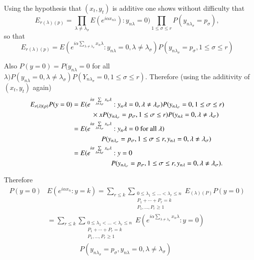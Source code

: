 Using the hypothesis that $(x_t,y_t)$ is additive one shows without
difficulty that 
$$
  E_{r(\lambda)(p)}=\prod\limits_{\lambda \neq \lambda_\sigma}E(e^{i
  \alpha x_{n \lambda}})  : y_{n \lambda} = 0) \prod\limits_{1 \leq
  \sigma \leq r} P(y_{n \lambda_\sigma} = p_\sigma),
$$
so that
$$
E_{r(\lambda)(p)} = E(e^{i \alpha \sum \limits_{\lambda \neq \lambda_
    \sigma} x_n \lambda } : y_{n \lambda} = 0 , \lambda \neq
  \lambda_\sigma) P(y_{n \lambda_\sigma} = p_\sigma , 1 \leq \sigma
  \leq r) 
$$

Also $P(y=0)=P(y_{n \lambda}=0 $ for all $\lambda)P(y_{n \lambda}=0,
\lambda \neq \lambda_ \sigma)P(Y_{n \lambda_ \sigma}=0,1 \leq \sigma
\leq r)$. Therefore (using the additivity of $(x_t,y_t)$ again) 
{\fontsize{10pt}{12pt}\selectfont
\begin{align*}
E_{r(\lambda)(p)}P(y=0)& =E (e^{i \alpha \sum\limits_{\lambda \neq
      \lambda_ \sigma}x_n \lambda}:y_n \lambda=0, \lambda \neq
  \lambda_ \sigma)P(y_{n \lambda_ \sigma}=0,1 \leq \sigma \leq r)\\
  & \hspace{1cm}\times xP(y_{n \lambda_ \sigma}=p_ \sigma, 1 \leq \sigma \leq
  r)P(y_{n \lambda}=0, \lambda \neq \lambda_\sigma)\\ 
  &=E (e^{i \alpha \sum\limits_{\lambda \neq \lambda_ \sigma}x_n
    \lambda}:y_n \lambda=0 \text{ for all }\lambda)\\
  & \hspace{1.5cm}P(y_{n \lambda_
    \sigma}=p_ \sigma,1 \leq \sigma \leq r,y_{n \lambda}=0,\lambda
  \neq \lambda_ \sigma)\\ 
  &=E(e^{i\alpha \sum\limits_{\lambda \neq \lambda_ \sigma}x_n
    \lambda}:y=0\\
  & \hspace{2cm}P(y_{n \lambda_ \sigma}=p_ \sigma,1 \leq
  \sigma \leq r,y_{n \lambda}=0,\lambda \neq \lambda_ \sigma). 
\end{align*}}\relax

Therefore\pageoriginale
\begin{align*}
P(y=0) & E(e^{i \alpha x_n} : y = k)=  \sum_{r \leq k} \sum_{\substack{0
    \leq \lambda_1 \leq \ldots< \lambda_r \leq
    n\\{P_1+\cdots +P_r=k}\\{P_1,\ldots,P_r\geq 1}}}
E_{(\lambda)(P)}P(y=0)\\ 
& =\sum_{r \leq k} \sum_{\substack{0 \leq \lambda_1 <\ldots <
    \lambda_r \leq n\\
     {P_1+\cdots + P_r=k}\\{P_1,\ldots, P_r\geq 1}}}E(e^{i \alpha
  \sum\limits_{\lambda \neq \lambda_\sigma}x_n \lambda}:y=0)\\
& \hspace{2cm}P(y_{n \lambda_\sigma}=p_\sigma,y_{n\lambda}=0,\lambda
\neq \lambda_\sigma)  
\end{align*}

